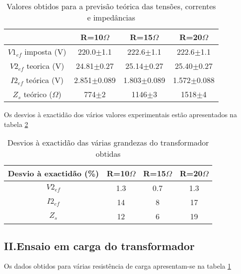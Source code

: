 \documentclass[%
  reprint,
  nofootinbib,
  amsmath,amssymb,
  aps,
  10pt,
]{revtex4-1}
\begin{document}
\begin{table}[h]
\begin{tabular}{c|c|c|c}
                         & R=10$\Omega$    & R=15$\Omega$    & R=20$\Omega$    \\ \hline
$V1_{ef}$ imposta (V)    & 220.0$\pm$1.1   & 222.6$\pm$1.1   & 222.6$\pm$1.1   \\ \hline
$V2_{ef}$ teorica (V)    & 24.81$\pm$0.27  & 25.14$\pm$0.27  & 25.40$\pm$0.27  \\ \hline
$I2_{ef}$ teórica (V)    & 2.851$\pm$0.089 & 1.803$\pm$0.089 & 1.572$\pm$0.088 \\ \hline
$Z_s$ teórico ($\Omega$) & 774$\pm$2       & 1146$\pm$3      & 1518$\pm$4     
\end{tabular}
\caption{Valores obtidos para a previsão teórica das tensões, correntes e impedâncias}
\label{tab:carga}
\end{table}
Os desvios à exactidão dos vários valores experimentais estão apresentados na tabela \ref{tab:exac}
\begin{table}[h]
\begin{tabular}{c|c|c|c}
Desvio à exactidão (\%) & R=10$\Omega$ & R=15$\Omega$ & R=20$\Omega$ \\ \hline
$V2_{ef}$               & 1.3          & 0.7          & 1.3          \\ \hline
$I2_{ef}$               & 14           & 8            & 17           \\ \hline
$Z_s$                   & 12           & 6            & 19          
\end{tabular}
\caption{Desvios à exactidão das várias grandezas do transformador obtidas}
\label{tab:exac}
\end{table}

\subsection*{II.Ensaio em carga do transformador}
Os dados obtidos para várias resistência de carga apresentam-se na tabela \ref{tab:carga}
\end{document}

